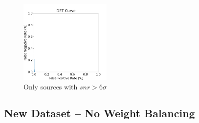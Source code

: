 \documentclass[DM,authoryear,toc]{lsstdoc}
\begin{document}
\begin{figure}[h]
  \includegraphics[width=0.4\textwidth]{det_13-resnet50-FullAugmentation-scratch-B64__0255000__npy_data_0.1.2-6sigma_256by256__posw_20.png}
  \caption{Only sources with $snr > 6\sigma$}
  \label{fig:tract_templates}
\end{figure}

\clearpage

\subsection{New Dataset -- No Weight Balancing}
\end{document}
